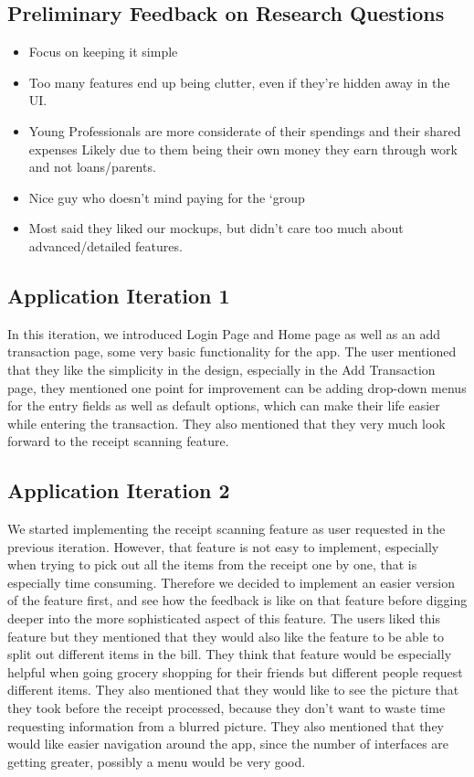 \documentclass[a4wide, 11pt]{article}
\begin{document}
\subsection{Preliminary Feedback on Research Questions}
\label{feedback}
\begin{itemize}
  \item Focus on keeping it simple
  \item Too many features end up being clutter, even if they’re hidden away in the UI.
  \item Young Professionals are more considerate of their spendings and their shared expenses
Likely due to them being their own money they earn through work and not loans/parents.
  \item Nice guy who doesn’t mind paying for the `group
  \item Most said they liked our mockups, but didn’t care too much about advanced/detailed features.
\end{itemize}

\subsection{Application Iteration 1}

In this iteration, we introduced Login Page and Home page as well as an add transaction page, some very basic functionality for the app. The user mentioned that they like the simplicity in the design, especially in the Add Transaction page, they mentioned one point for improvement can be adding drop-down menus for the entry fields as well as default options, which can make their life easier while entering the transaction. They also mentioned that they very much look forward to the receipt scanning feature.



\subsection{Application Iteration 2}

We started implementing the receipt scanning feature as user requested in the previous iteration. However, that feature is not easy to implement, especially when trying to pick out all the items from the receipt one by one, that is especially time consuming. Therefore we decided to implement an easier version of the feature first, and see how the feedback is like on that feature before digging deeper into the more sophisticated aspect of this feature. The users liked this feature but they mentioned that they would also like the feature to be able to split out different items in the bill. They think that feature would be especially helpful when going grocery shopping for their friends but different people request different items. They also mentioned that they would like to see the picture that they took before the receipt processed, because they don't want to waste time requesting information from a blurred picture. They also mentioned that they would like easier navigation around the app, since the number of interfaces are getting greater, possibly a menu would be very good.
\end{document}

